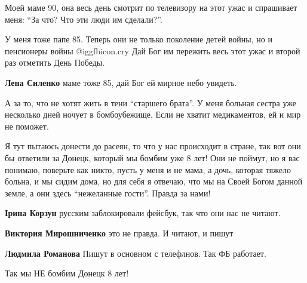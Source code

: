  
 
 
 
 
\zzSecCmt

\begin{itemize} %

Моей маме 90, она весь день смотрит по телевизору на этот ужас и спрашивает
меня: \enquote{За что? Что эти люди им сделали?}.


У меня тоже папе 85. Теперь они не только поколение детей войны, но и
пенсионеры войны  @igg{fbicon.cry}  Дай Бог им пережить весь этот ужас и второй раз отметить
День Победы.


\textbf{Лена Силенко} маме тоже 85, дай Бог ей мирное небо увидеть.


А за то, что не хотят жить в тени \enquote{старшего брата}. У меня больная сестра уже
несколько дней ночует в бомбоубежище, Если не хватит медикаментов, ей и мир не
поможет.


Я тут пытаюсь донести до расеян, то что у нас происходит в стране, так вот они
бы ответили за Донецк, который мы бомбим уже 8 лет!  Они не поймут, но я вас
понимаю, поверьте как никто, пусть у меня и не мама, а дочь, которая тяжело
больна, и мы сидим дома, но для себя я отвечаю, что мы на Своей Богом данной
земле, а они здесь \enquote{нежеланные гости}. Правда за нами!

\begin{itemize} %
\textbf{Ірина Корзун} русским заблокировали фейсбук, так что они нас не читают.

\textbf{Виктория Мирошниченко} это не правда. И читают, и пишут

\textbf{Людмила Романова} Пишут в основном с телефлнов. Так ФБ работает.

Так мы НЕ бомбим Донецк 8 лет!
\end{itemize} %

\end{itemize} %
